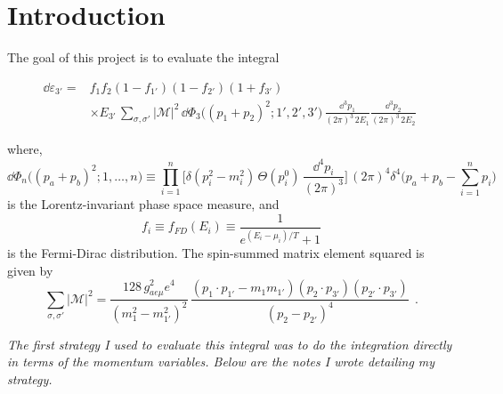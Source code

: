 \section{Introduction}\label{sec:introduction}
The goal of this project is to evaluate the integral 

\begin{bluenv}{}
    \begin{equation}
    \label{eq:emissivity-integral}
    \begin{aligned}
        \dd \varepsilon_{3'} = 
            & f_1 f_2 (1 - f_{1'}) (1 - f_{2'}) (1 + f_{3'}) \\
            &\times E_{3'} \,
            \sum_{\sigma, \sigma'} | \mathcal{M} |^2 \,
            \dd \Phi_3 \big( (p_1 + p_2)^2; 1', 2', 3'\big)
            \,
            \frac{\dd^3 p_1}{(2\pi)^3\, 2 E_1}
            \frac{\dd^3 p_2}{(2\pi)^3\, 2 E_2} 
            \; 
    \end{aligned}
    \end{equation}
\end{bluenv}
where, 
\begin{equation}
    \label{eq:LIPS}
    \dd \Phi_n \big((p_a + p_b)^2; 1, \ldots, n \big) \equiv 
    \prod_{i=1}^{n}
    \bigg[
         \delta (p_i^2 - m_i^2) \, \Theta(p_i^0) \, 
        \frac{\dd^4 p_i}{(2\pi)^3}
    \bigg] \, (2\pi)^4 \delta^4 
    \bigg( 
        p_a + p_b - \sum_{i=1}^{n} p_i
    \bigg) \quad 
\end{equation}
is the Lorentz-invariant phase space measure, and
\begin{equation*}
    f_i \equiv f_{FD}(E_i) \equiv \frac{1}{e^{(E_i - \mu_i)/T} + 1}
\end{equation*}
is the Fermi-Dirac distribution. 
The spin-summed matrix element squared is given by
\begin{equation}
    \label{eq:matrix-element}
    \sum_{\sigma, \sigma'} | \mathcal{M} |^2 
        = 
        \frac{128 \, g^2_{ae\mu} e^4}{(m_1^2 - m_{1'}^2)^2} \,
        \frac{
             (p_1 \cdot p_{1'} - m_1 m_{1'})
            (p_2 \cdot p_{3'})
            (p_{2'} \cdot p_{3'})
        }
        {
            (p_2 - p_{2'})^4
        } \; \, .
\end{equation}

\emph{The first strategy I used to evaluate this integral was to do the integration directly in terms of the momentum variables. Below are the notes I wrote detailing my strategy.}

